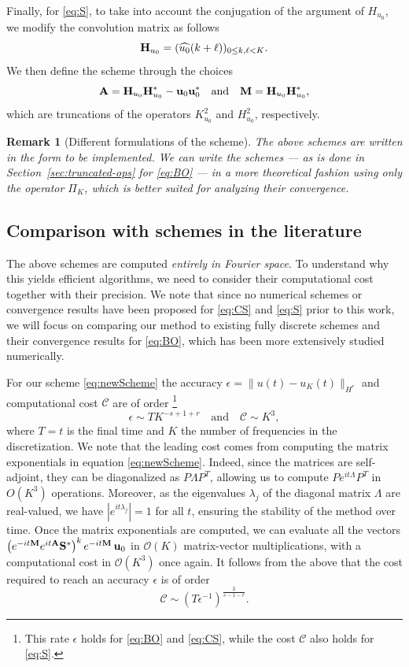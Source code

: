 \documentclass [11pt] {article}
\newtheorem{rem}[thm]{Remark}
\begin{document}
Finally, for \eqref{eq:S}, to take into account the conjugation of the argument of $H_{u_0}$, we modify the convolution matrix as follows
\[
{\bf H}_{u_0} = (\widehat{u_0}(k+\ell))_{0\leq k,\ell < K}.
\]
We then define the scheme through the choices
\begin{equation}
\label{AM-S}
{\bf A} = {\bf H}_{u_0}{\bf H}_{u_0}^*- {\bf u}_0{\bf u}_0^*
\quad \text{and}\quad {\bf M} = {\bf H}_{u_0}{\bf H}_{u_0}^*,
\end{equation}
which are truncations of the operators $K_{u_0}^2$ and $H_{u_0}^2$, respectively. 

\begin{rem}[Different formulations of the scheme]
The above schemes are written in the form to be implemented. 
We can write the schemes --- as is done in Section~\ref{sec:truncated-ops} for \eqref{eq:BO} --- in a more theoretical fashion using only the operator $\Pi_K$, which is better suited for analyzing their convergence.
\end{rem}


\subsection{Comparison with schemes in the literature}

\label{sec:comparison}
The above schemes are computed {\it entirely in Fourier space}. To understand why this yields efficient algorithms, we need to consider  their computational cost together with their precision. We note that since no numerical schemes or convergence results have been proposed for \eqref{eq:CS} and \eqref{eq:S} prior to this work, we will focus on comparing our method to existing fully discrete schemes and their convergence results for \eqref{eq:BO}, which has been more extensively studied numerically.


For our scheme \eqref{eq:newScheme} the accuracy $\epsilon = \|u(t) - u_{K}(t) \|_{H^r}$ and computational cost $\mathcal{C}$ are of order \footnote[3]{This rate $\epsilon$ holds for \eqref{eq:BO} and \eqref{eq:CS}, while the cost $\mathcal{C}$ also holds for \eqref{eq:S}.}
\[
\epsilon \sim TK^{-s+1+r} \quad \text{and} \quad \mathcal{C} \sim K^{3},
\]
where $T = t$ is the final time and $K$ the number of frequencies in the discretization.
We note that the leading cost comes from computing the matrix exponentials in equation \eqref{eq:newScheme}. Indeed, since the matrices are self-adjoint, they can be diagonalized as $P\Lambda P^T$, allowing us to compute $Pe^{it\Lambda}P^T$ in $O(K^3)$ operations. Moreover, as the eigenvalues $\lambda_j$ of the diagonal matrix $\Lambda$ are real-valued, we have $|e^{it\lambda_j}| = 1$ for all $t$, ensuring the stability of the method over time.
Once the matrix exponentials are computed, we can evaluate all the vectors $\left(e^{-it{\bf M}}e^{it{\bf A}}{\bf S}^*\right)^k e^{-it{\bf M}}\,{\bf u}_0$ in $\mathcal O(K)$ matrix-vector multiplications, with a computational cost in $\mathcal O(K^3)$ once again.
It follows from the above that the cost required to reach an accuracy $\epsilon$ is of order
\begin{equation}
\label{eq:cost-eps}
\mathcal{C} \sim \left(T\epsilon^{-1}\right)^{\frac{3}{s-1-r}}.
\end{equation}
\end{document}
